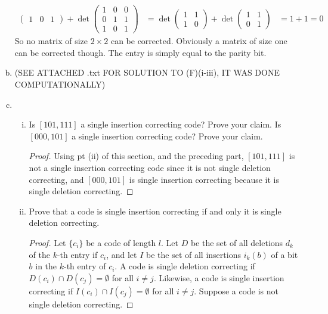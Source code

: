 \documentclass{article}
\begin{document}
\begin{enumerate}[(a)]
\begin{align*}
\begin{pmatrix}
            1 & 0 & 1
          \end{pmatrix}
          +
          \det
          \begin{pmatrix}
            1 & 0 & 0 \\
            0 & 1 & 1 \\
            1 & 0 & 1
          \end{pmatrix}
      & =
      \det
        \begin{pmatrix}
          1 & 1 \\
          1 & 0
        \end{pmatrix}
        +
        \det
        \begin{pmatrix}
          1 & 1 \\
          0 & 1
        \end{pmatrix}
      & = 1 + 1 = 0
    \end{align*}
    So no matrix of size $2 \times 2$ can be corrected. Obviously a matrix
    of size one can be corrected though. The entry is simply equal to the
    parity bit.
  \item
    (SEE ATTACHED .txt FOR SOLUTION TO (F)(i-iii), IT WAS DONE
    COMPUTATIONALLY)
  \item
    \begin{enumerate}[(i)]
      \item
        Is $[101,111]$ a single insertion correcting code? Prove your claim.
        Is $[000,101]$ a single insertion correcting code? Prove your claim.
        \begin{proof} Using pt (ii) of this section, and the preceding part,
          $[101,111]$ is not a single insertion correcting code since it is
          not single deletion correcting, and $[000,101]$ is single
          insertion correcting because it is single deletion correcting.
        \end{proof}
      \item
        Prove that a code is single insertion correcting if and only it is
        single deletion correcting.
        \begin{proof} Let $\{c_i\}$ be a code of length $l$. Let $D$ be the
          set of all deletions $d_k$ of the $k$-th entry if $c_i$, and let $I$
          be the set of all insertions $i_k(b)$ of a bit $b$ in the $k$-th
          entry of $c_i$. A code is single deletion correcting if $D(c_i)
          \cap D(c_j) = \emptyset$ for all $i \neq j$. Likewise, a code is
          single insertion correcting if $I(c_i) \cap I(c_j) = \emptyset$ for
          all $i \neq j$. Suppose a code is not single deletion correcting.

\end{proof}
\end{enumerate}
\end{enumerate}
\end{document}
